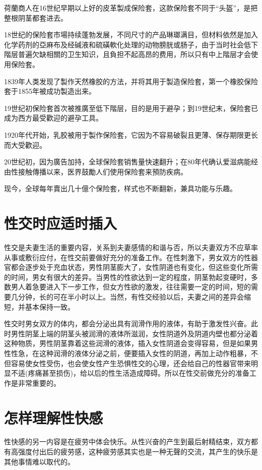 \documentclass[12pt,UTF8]{ctexbook}
\begin{document}
荷蘭商人在16世纪早期以上好的皮革製成保险套，这款保险套不同于“头盔”，是把整根阴茎都套进去。

18世纪的保险套市場持续蓬勃发展，不同尺寸的产品琳瑯满目，但材料依然是加入化学药剂的亞麻布及经碱液和硫磺軟化处理的动物膀胱或肠子，由于当时社会低下階层普遍欠缺相關的卫生知识，且負担不起高昂的费用，所以只有中上階层才会使用保险套。

1839年人类发现了製作天然橡胶的方法，并将其用于製造保险套，第一个橡胶保险套于1855年被成功製造出来。

19世纪初保险套首次被推廣至低下階层，目的是用于避孕；到19世纪末，保险套已成为西方最受歡迎的避孕工具。

1920年代开始，乳胶被用于製作保险套，它因为不容易破裂且更薄、保存期限更长而大受歡迎。

20世纪初，因为廣告加持，全球保险套销售量快速翻升；在80年代确认爱滋病能经由性接触傳播以来，医界鼓勵人们使用保险套来預防疾病。

现今，全球每年賣出几十億个保险套，样式也不断翻新，兼具功能与乐趣。



\section{性交时应适时插入}

性交是夫妻生活的重要内容，关系到夫妻感情的和谐与否，所以夫妻双方不应草率从事或敷衍应付，在性交前要做好充分的准备工作。在性刺激下，男女双方的性器官都会逐步处于充血状态，男性阴茎膨大了，女性阴道也有变化，但这些变化所需的时间，男女有很大的差异。当男性的性欲达到一定的程度，阴茎勃起变硬时，多数男人着急要进入下一步工作，但女方性欲的激发，往往需要一定的时间，短的需要几分钟，长的可在半小时以上。当然，有性交经验以后，夫妻之间的差异会缩短，并基本保持一致。

性交时男女双方的体内，都会分泌出具有润滑作用的液体，有助于激发性兴奋。此时男性阴茎上端的阴茎头被润滑的液体所滋润，女性阴道外及阴道内壁也都分泌着这种物质，男性阴茎靠着这些润滑的液体，插入女性阴道会变得容易，但是如果男性性急，在这种润滑的液体分泌之前，便要插入女性的阴道，再加上动作粗暴，不但容易使女性受伤，也会使女性产生恐惧性交的心理，还会给自己的性器官带来明显不适(疼痛甚至损伤)，给以后的性生活造成障碍。所以在性交前做充分的准备工作是非常重要的。

\section{怎样理解性快感}

性快感的另一内容是在疲劳中体会快乐。从性兴奋的产生到最后射精结束，双方都有高强度付出后的疲劳感，这种疲劳感其实也是一种无聲的交流，其产生的快乐是其他事情难以取代的。
\end{document}
